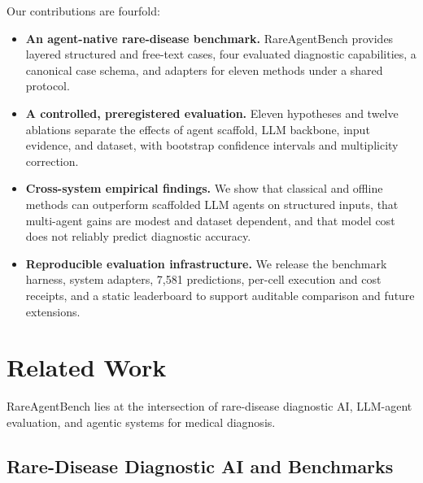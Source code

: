 \documentclass[letterpaper]{article} %
\begin{document}
Our contributions are fourfold:
\begin{itemize}
  \item \textbf{An agent-native rare-disease benchmark.} RareAgentBench provides layered structured and free-text cases, four evaluated diagnostic capabilities, a canonical case schema, and adapters for eleven methods under a shared protocol.
  \item \textbf{A controlled, preregistered evaluation.} Eleven hypotheses and twelve ablations separate the effects of agent scaffold, LLM backbone, input evidence, and dataset, with bootstrap confidence intervals and multiplicity correction.
  \item \textbf{Cross-system empirical findings.} We show that classical and offline methods can outperform scaffolded LLM agents on structured inputs, that multi-agent gains are modest and dataset dependent, and that model cost does not reliably predict diagnostic accuracy.
  \item \textbf{Reproducible evaluation infrastructure.} We release the benchmark harness, system adapters, 7,581 predictions, per-cell execution and cost receipts, and a static leaderboard to support auditable comparison and future extensions.
\end{itemize}



\section{Related Work}
\label{sec:related-work}

RareAgentBench lies at the intersection of rare-disease diagnostic AI, LLM-agent evaluation, and agentic systems for medical diagnosis.

\subsection{Rare-Disease Diagnostic AI and Benchmarks}
\end{document}
